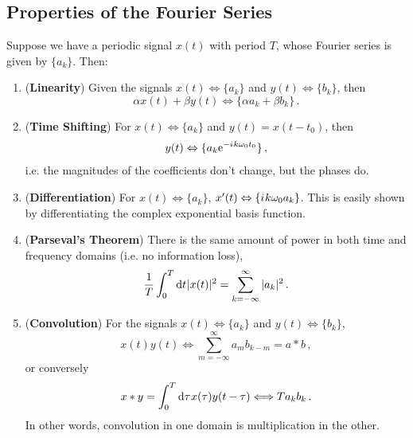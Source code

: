 \subsection{Properties of the Fourier Series}
%
Suppose we have a periodic signal $x(t)$ with period $T$, whose Fourier series is given by
$\{a_k\}$. Then:
%
\begin{enumerate}
\item (\textbf{Linearity}) Given the signals $x(t) \Leftrightarrow \{a_k\}$ and
  $y(t) \Leftrightarrow \{b_k\}$, then
  \begin{displaymath}
    \alpha x(t) + \beta y(t) \Leftrightarrow \{\alpha a_k + \beta b_k\} \,.
  \end{displaymath}
\item (\textbf{Time Shifting}) For $x(t) \Leftrightarrow \{a_k\}$ and
  $y(t) = x(t-t_0)$, then
  \begin{displaymath}
    y(t) \Leftrightarrow \{a_k\mathrm{e}^{-{i\mkern1mu} k\omega_0t_0}\} \,,
  \end{displaymath}
  i.e. the magnitudes of the coefficients don't change, but the phases do.
\item (\textbf{Differentiation}) For $x(t) \Leftrightarrow \{a_k\}$,
  $x^\prime(t) \Leftrightarrow \{{i\mkern1mu} k\omega_0 a_k\}$. This is easily shown by
  differentiating the complex exponential basis function.
\item (\textbf{Parseval's Theorem}) There is the same amount of power in both time
  and frequency domains (i.e. no information loss),
  \begin{displaymath}
    \frac{1}{T}\int_0^T \mathrm{d}t\mkern1mu |x(t)|^2 = \sum_{k=-\infty}^\infty |a_k|^2 \,.
  \end{displaymath}
\item (\textbf{Convolution}) For the signals $x(t) \Leftrightarrow \{a_k\}$ and
  $y(t) \Leftrightarrow \{b_k\}$,
  \begin{displaymath}
    x(t)y(t) \Longleftrightarrow \sum_{m=-\infty}^\infty a_m b_{k-m} = a * b \,,
  \end{displaymath}
  or conversely
  \begin{displaymath}
    x* y = \int_0^T \mathrm{d}\tau\mkern1mu x(\tau)y(t-\tau) \Longleftrightarrow Ta_kb_k \,.
  \end{displaymath}
  In other words, convolution in one domain is multiplication in the other. 
\end{enumerate}
